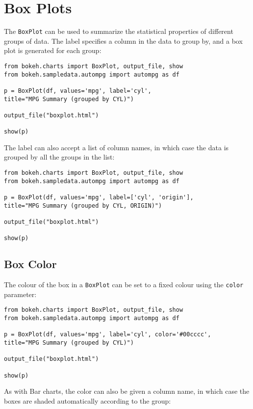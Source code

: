 \documentclass[a4paper,12pt]{article}
\begin{document}
	\Large
\section*{Box Plots}
The \texttt{BoxPlot} can be used to summarize the statistical properties of different groups of data. The label specifies a column in the data to group by, and a box plot is generated for each group:
{
\large
\begin{framed}
\begin{verbatim}
from bokeh.charts import BoxPlot, output_file, show
from bokeh.sampledata.autompg import autompg as df

p = BoxPlot(df, values='mpg', label='cyl',
title="MPG Summary (grouped by CYL)")

output_file("boxplot.html")

show(p)
\end{verbatim}
\end{framed}
}
\newpage
\noindent The label can also accept a list of column names, in which case the data is grouped by all the groups in the list:
{
	\large
\begin{framed}
	\begin{verbatim}
from bokeh.charts import BoxPlot, output_file, show
from bokeh.sampledata.autompg import autompg as df

p = BoxPlot(df, values='mpg', label=['cyl', 'origin'],
title="MPG Summary (grouped by CYL, ORIGIN)")

output_file("boxplot.html")

show(p)
\end{verbatim}
\end{framed}
}
\newpage
\subsection*{Box Color}
The colour of the box in a \texttt{BoxPlot} can be set to a fixed colour using the \texttt{color} parameter:
{
	\large
\begin{framed}
	\begin{verbatim}
from bokeh.charts import BoxPlot, output_file, show
from bokeh.sampledata.autompg import autompg as df

p = BoxPlot(df, values='mpg', label='cyl', color='#00cccc',
title="MPG Summary (grouped by CYL)")

output_file("boxplot.html")

show(p)
\end{verbatim}
\end{framed}
}
\newpage
\noindent As with Bar charts, the color can also be given a column name, in which case the boxes are shaded automatically according to the group:\\
 
\end{document}
